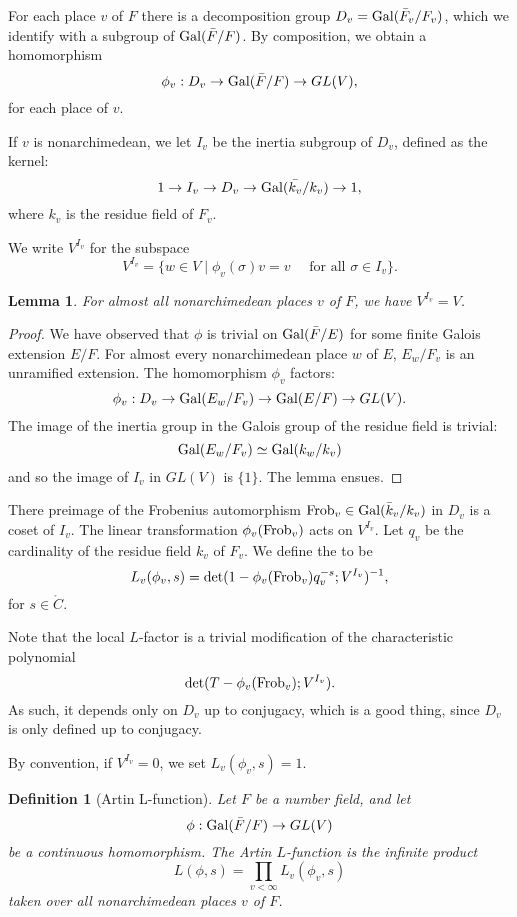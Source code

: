 \documentclass{amsart}
\newtheorem{definition}[equation]{Definition}
\newtheorem{lemma}[equation]{Lemma}
\def\CC{\ring{C}}
\def\oG{\op{Gal}}
\begin{document}
For each place $v$ of $F$ there is a decomposition group
$D_v=\oG(\bar F_v/F_v)$, which we identify with a subgroup of
$\oG(\bar F/F)$.  By composition, we obtain a homomorphism
\[
\phi_v:D_v \to \oG(\bar F/F)\to GL(V),
\]
for each place of $v$.   

If $v$ is nonarchimedean, we let $I_v$ be
the inertia subgroup of $D_v$, defined as the kernel:
\[
1 \to I_v \to D_v \to \oG(\bar {k_v}/k_v)\to 1,
\]
where $k_v$ is the residue field of $F_v$.

We write $V^{I_v}$ for the subspace
\[
V^{I_v} = \{w\in V\mid \phi_v(\sigma)v = v \quad\text{ for all } \sigma\in I_v\}.
\]

\begin{lemma}
For almost all nonarchimedean places $v$ of $F$, we have $V^{I_v} = V$.
\end{lemma}

\begin{proof}
We have observed that $\phi$ is trivial on $\oG(\bar{F}/E)$ for some finite
Galois extension $E/F$.  For almost every nonarchimedean place $w$ of $E$,
$E_w/F_v$ is an unramified extension.  The homomorphism $\phi_v$ factors:
\[
\phi_v:D_v\to \oG(E_w/F_v)\to \oG(E/F)\to GL(V).
\]
The image of the inertia group in the Galois group of the residue field is trivial:
\[
\oG(E_w/F_v)\simeq \oG(k_w/k_v)
\]
and so the image of $I_v$ in $GL(V)$ is $\{1\}$.  The lemma ensues.
\end{proof}

There preimage of the Frobenius automorphism $\op{Frob}_v\in\oG(\bar{k}_v/k_v)$ 
in $D_v$ is
a coset of $I_v$.  The linear transformation $\phi_v({\operatorname{Frob}}_v)$ acts
on $V^{I_v}$.
Let $q_v$ be the cardinality of the residue field $k_v$ of $F_v$.
We define the  to be
\[
L_v(\phi_v,s) = {\operatorname{det}}(1- \phi_v({\operatorname{Frob}}_v) q_v^{-s}; V^{I_v})^{-1},
\]
for $s\in \CC$.

Note that the local $L$-factor is a trivial modification of the characteristic polynomial
\[
{\operatorname{det}}(T - \phi_v({\operatorname{Frob}}_v); V^{I_v}).
\]
As such, it depends only on  $D_v$ up to conjugacy, which is a good thing, since
$D_v$ is only defined up to conjugacy.

By convention, if $V^{I_v}=0$, we set $L_v(\phi_v,s)=1$.

\begin{definition}[Artin L-function]  Let $F$ be a number field, and let
\[
\phi:\oG(\bar{F}/F)\to GL(V)
\]
be a continuous homomorphism.
The Artin $L$-function is the infinite product
\[
L(\phi,s) = \prod_{v<\infty} L_v(\phi_v,s)
\]
taken over all nonarchimedean places $v$ of $F$.
\end{definition}
\end{document}

